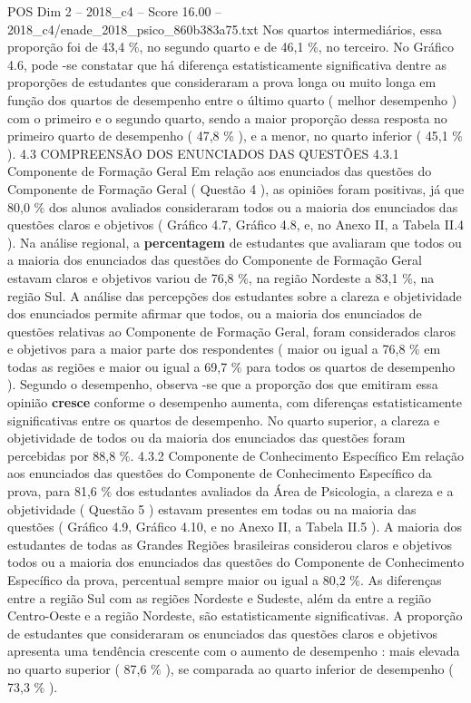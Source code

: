 \begin{textsample}{POS Dim 2 – 2018\_c4 – Score 16.00 – 2018\_c4/enade\_2018\_psico\_860b383a75.txt}
Nos quartos intermediários, essa proporção foi de 43,4 \%, no segundo quarto e de 46,1 \%, no terceiro.
No Gráfico 4.6, pode -se constatar que há diferença estatisticamente significativa dentre as proporções de estudantes que consideraram a prova longa ou muito longa em função dos quartos de desempenho entre o último quarto ( melhor desempenho ) com o primeiro e o segundo quarto, sendo a maior proporção dessa resposta no primeiro quarto de desempenho ( 47,8 \% ), e a menor, no quarto inferior ( 45,1 \% ). 4.3 COMPREENSÃO DOS ENUNCIADOS DAS QUESTÕES 4.3.1 Componente de Formação Geral Em relação aos enunciados das questões do Componente de Formação Geral ( Questão 4 ), as opiniões foram positivas, já que 80,0 \% dos alunos avaliados consideraram todos ou a maioria dos enunciados das questões claros e objetivos ( Gráfico 4.7, Gráfico 4.8, e, no Anexo II, a Tabela II.4 ).
Na análise regional, a \textbf{percentagem} de estudantes que avaliaram que todos ou a maioria dos enunciados das questões do Componente de Formação Geral estavam claros e objetivos variou de 76,8 \%, na região Nordeste a 83,1 \%, na região Sul.
A análise das percepções dos estudantes sobre a clareza e objetividade dos enunciados permite afirmar que todos, ou a maioria dos enunciados de questões relativas ao Componente de Formação Geral, foram considerados claros e objetivos para a maior parte dos respondentes ( maior ou igual a 76,8 \% em todas as regiões e maior ou igual a 69,7 \% para todos os quartos de desempenho ).
Segundo o desempenho, observa -se que a proporção dos que emitiram essa opinião \textbf{cresce} conforme o desempenho aumenta, com diferenças estatisticamente significativas entre os quartos de desempenho.
No quarto superior, a clareza e objetividade de todos ou da maioria dos enunciados das questões foram percebidas por 88,8 \%. 4.3.2 Componente de Conhecimento Específico Em relação aos enunciados das questões do Componente de Conhecimento Específico da prova, para 81,6 \% dos estudantes avaliados da Área de Psicologia, a clareza e a objetividade ( Questão 5 ) estavam presentes em todas ou na maioria das questões ( Gráfico 4.9, Gráfico 4.10, e no Anexo II, a Tabela II.5 ).
A maioria dos estudantes de todas as Grandes Regiões brasileiras considerou claros e objetivos todos ou a maioria dos enunciados das questões do Componente de Conhecimento Específico da prova, percentual sempre maior ou igual a 80,2 \%.
As diferenças entre a região Sul com as regiões Nordeste e Sudeste, além da entre a região Centro-Oeste e a região Nordeste, são estatisticamente significativas.
A proporção de estudantes que consideraram os enunciados das questões claros e objetivos apresenta uma tendência crescente com o aumento de desempenho : mais elevada no quarto superior ( 87,6 \% ), se comparada ao quarto inferior de desempenho ( 73,3 \% ).

\end{textsample}
